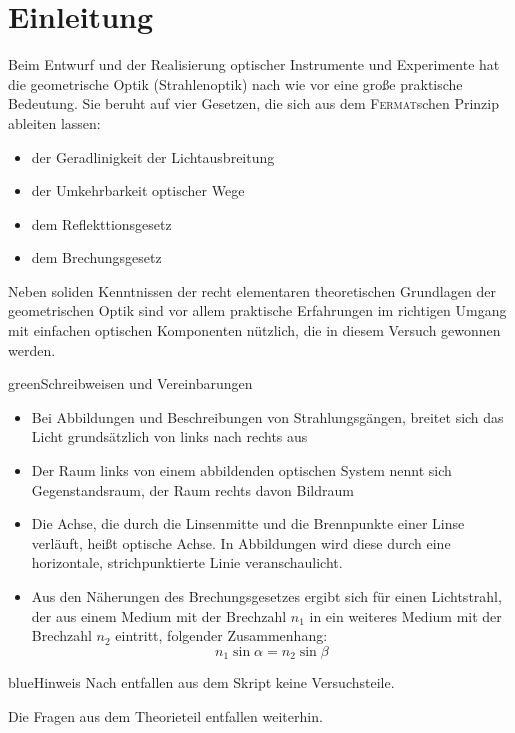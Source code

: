 \documentclass[../protokoll.tex]{subfiles}
\begin{document}
\part{Einleitung}
Beim Entwurf und der Realisierung optischer Instrumente und Experimente hat die geometrische Optik
(Strahlenoptik) nach wie vor eine große praktische Bedeutung. Sie beruht auf vier Gesetzen, die sich aus
dem \textsc{Fermat}schen Prinzip ableiten lassen: 
\begin{itemize}
    \item der Geradlinigkeit der Lichtausbreitung
    \item der Umkehrbarkeit optischer Wege
    \item dem Reflekttionsgesetz
    \item dem Brechungsgesetz
\end{itemize}
Neben soliden Kenntnissen der recht
elementaren theoretischen Grundlagen der geometrischen Optik sind vor allem praktische Erfahrungen im
richtigen Umgang mit einfachen optischen Komponenten nützlich, die in diesem Versuch gewonnen
werden.

\begin{messageBox}{green}{Schreibweisen und Vereinbarungen}
    \begin{itemize}[noitemsep,leftmargin=*]
        \item Bei Abbildungen und Beschreibungen von Strahlungsgängen, breitet
                sich das Licht grundsätzlich von links nach rechts aus
        \item Der Raum links von einem abbildenden optischen System nennt sich
                Gegenstandsraum, der Raum rechts davon Bildraum
        \item Die Achse, die durch die Linsenmitte und die Brennpunkte einer
                Linse verläuft, heißt optische Achse. In Abbildungen wird
                diese durch eine horizontale, strichpunktierte Linie veranschaulicht.
        \item Aus den Näherungen des Brechungsgesetzes ergibt sich für einen Lichtstrahl,
                der aus einem Medium mit der Brechzahl $n_1$ in ein weiteres Medium mit
                der Brechzahl $n_2$ eintritt, folgender Zusammenhang:
                \begin{equation}\label{eq:Verhältnis Brechzahlen}
                    n_1 \sin \alpha = n_2 \sin \beta
                \end{equation}
    \end{itemize}

    
\end{messageBox}

\begin{messageBox}{blue}{Hinweis}
    Nach \cite{listeEntfallendeVersuche} entfallen aus dem Skript keine Versuchsteile.

    Die Fragen aus dem Theorieteil entfallen weiterhin.
\end{messageBox}
\end{document}
